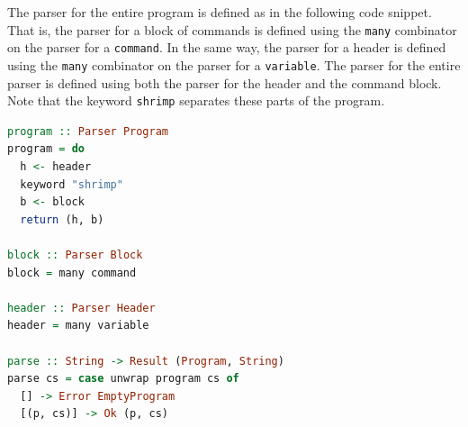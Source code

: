 \documentclass[12pt,a4paper]{article}
\begin{document}
The parser for the entire program is defined as in the following code snippet.
That is, the parser for a block of commands is defined using the \texttt{many} combinator on the parser for a \texttt{command}.
In the same way, the parser for a header is defined using the \texttt{many} combinator on the parser for a \texttt{variable}.
The parser for the entire parser is defined using both the parser for the header and the command block.
Note that the keyword \texttt{shrimp} separates these parts of the program.
\begin{lstlisting}[language=Haskell, style=custom-style]
program :: Parser Program
program = do
  h <- header
  keyword "shrimp"
  b <- block
  return (h, b)

block :: Parser Block
block = many command

header :: Parser Header
header = many variable

parse :: String -> Result (Program, String)
parse cs = case unwrap program cs of
  [] -> Error EmptyProgram
  [(p, cs)] -> Ok (p, cs)
\end{lstlisting}
\end{document}

